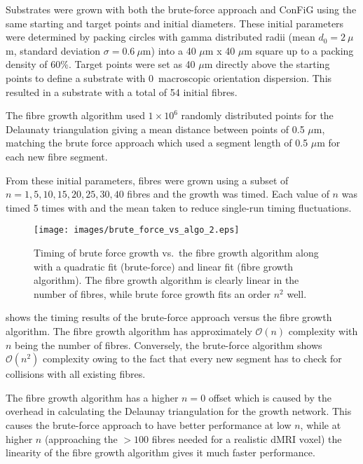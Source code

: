 Substrates were grown with both the brute-force approach and ConFiG using the same starting and target points and initial diameters.
These initial parameters were determined by packing circles with gamma distributed radii (mean $d_0 = 2\ \mu$m, standard deviation $\sigma = 0.6\ \mu$m) into a 40 $\mu$m x 40 $\mu$m square up to a packing density of 60\%. Target points were set as 40 $\mu$m directly above the starting points to define a substrate with 0\degree\ macroscopic orientation dispersion.
This resulted in a substrate with a total of 54 initial fibres.

The fibre growth algorithm used $1\times 10^6$ randomly distributed points for the Delaunaty triangulation giving a mean distance between points of 0.5 $\mu$m, matching the brute force approach which used a segment length of 0.5 $\mu$m for each new fibre segment.

From these initial parameters, fibres were grown using a subset of $n = 1, 5, 10, 15, 20, 25, 30, 40$ fibres and the growth was timed. Each value of $n$ was timed 5 times with and the mean taken to reduce single-run timing fluctuations.

\begin{figure}[t]
  \centering
  \texttt{[image: images/brute\_force\_vs\_algo\_2.eps]}
  \caption{\small Timing of brute force growth vs.\ the fibre growth algorithm along with a quadratic fit (brute-force) and linear fit (fibre growth algorithm). The fibre growth algorithm is clearly linear in the number of fibres, while brute force growth fits an order $n^2$ well. }
  \label{fig:brute_force_vs_algo}
\end{figure}

 shows the timing results of the brute-force approach versus the fibre growth algorithm.
The fibre growth algorithm  has approximately $\mathcal{O}(n)$ complexity with $n$ being the number of fibres.
Conversely, the brute-force algorithm shows $\mathcal{O}(n^2)$ complexity owing to the fact that every new segment has to check for collisions with all existing fibres.

The fibre growth algorithm has a higher $n=0$ offset which is caused by the overhead in calculating the Delaunay triangulation for the growth network.
This causes the brute-force approach to have better performance at low $n$, while at higher $n$ (approaching the $>100$ fibres needed for a realistic dMRI voxel) the linearity of the fibre growth algorithm gives it much faster performance.



